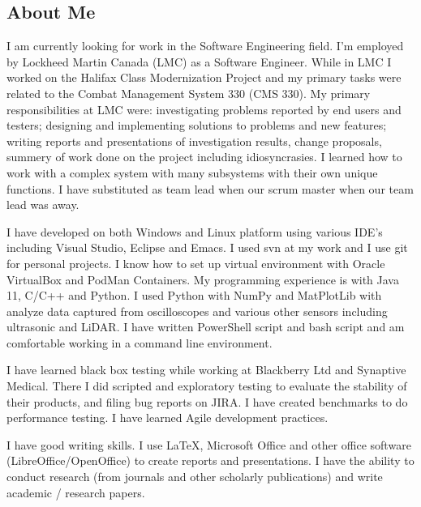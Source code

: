 \subsection*{\color{draculapurple}About Me}
I am currently looking for work in the Software Engineering field. I'm employed by Lockheed Martin Canada (LMC) as a Software Engineer. While in LMC I worked on the Halifax Class Modernization Project and my primary tasks were related to the Combat Management System 330 (CMS 330). My primary responsibilities at LMC were: investigating problems reported by end users and testers; designing and implementing solutions to problems and new features; writing reports and presentations of investigation results, change proposals, summery of work done on the project including idiosyncrasies. I learned how to work with a complex system with many subsystems with their own unique functions. I have substituted as team lead when our scrum master when our team lead was away.

I have developed on both Windows and Linux platform using various IDE's including Visual Studio, Eclipse and Emacs. I used svn at my work and I use git for personal projects. I know how to set up virtual environment with Oracle VirtualBox and PodMan Containers. My programming experience is with Java 11, C/C++ and Python.
I used Python with NumPy and MatPlotLib with analyze data captured from oscilloscopes and various other sensors including ultrasonic and LiDAR. I have written PowerShell script and bash script and am comfortable working in a command line environment.

I have learned black box testing while working at Blackberry Ltd and Synaptive Medical. There I did scripted and exploratory testing to evaluate the stability of their products, and filing bug reports on JIRA. I have created benchmarks to do performance testing. I have learned Agile development practices.

I have good writing skills. I use \LaTeX, Microsoft Office and other office software (LibreOffice/OpenOffice) to create reports and presentations. I have the ability to conduct research (from journals and other scholarly publications) and write academic / research papers.
